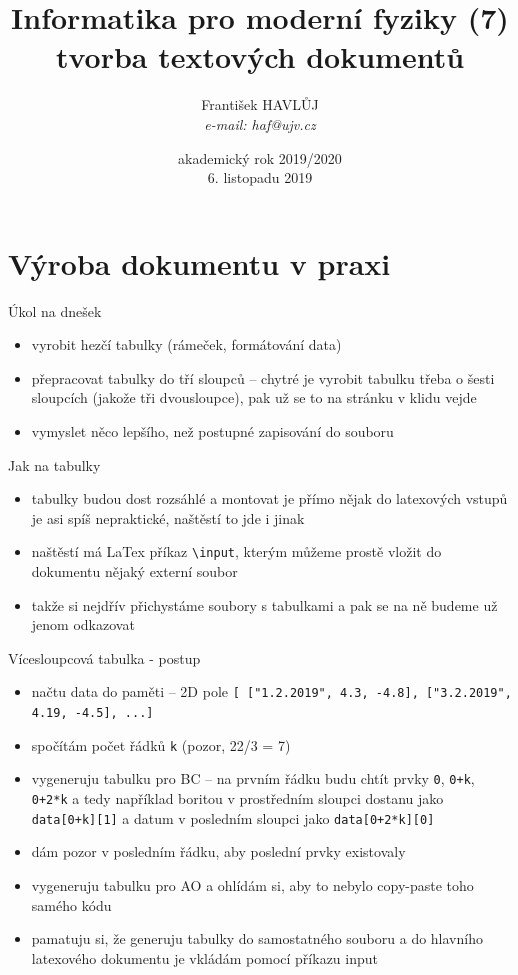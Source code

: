 \documentclass{beamer}
\title[IMF (7)]{Informatika pro moderní fyziky (7)\\tvorba textových dokumentů}
\author[Franti\v{s}ek HAVL\r{U}J, ORF ÚJV Řež]{Franti\v{s}ek HAVL\r{U}J\\{\scriptsize \emph{e-mail: haf@ujv.cz}}}
\date{akademický rok 2019/2020\\6. listopadu 2019}
\institute[ORF ÚJV Řež]
{ÚJV Řež\\oddělení Reaktorové fyziky a podpory palivového cyklu}
\begin{document}
\begin{frame}
  \titlepage
\end{frame}

\begin{frame}
  \tableofcontents
\end{frame}

\section{Výroba dokumentu v praxi}

\begin{frame}{Úkol na dnešek}
  \begin{itemize}
    \item vyrobit hezčí tabulky (rámeček, formátování data)
    \item přepracovat tabulky do tří sloupců --  chytré je vyrobit tabulku třeba o šesti sloupcích (jakože tři dvousloupce), pak už se to na stránku v klidu vejde

    \item vymyslet něco lepšího, než postupné zapisování do souboru
  \end{itemize}
\end{frame}

\begin{frame}[fragile]{Jak na tabulky}
  \begin{itemize}
    \item tabulky budou dost rozsáhlé a montovat je přímo nějak do latexových vstupů je asi spíš nepraktické, naštěstí to jde i jinak
    \item naštěstí má LaTex příkaz \texttt{\textbackslash{}input}, kterým můžeme prostě vložit do dokumentu nějaký externí soubor
    \item takže si nejdřív přichystáme soubory s tabulkami a pak se na ně budeme už jenom odkazovat
  \end{itemize}
\end{frame}


\begin{frame}[fragile]{Vícesloupcová tabulka - postup}
  \begin{itemize}
    \item načtu data do paměti -- 2D pole \texttt{[ ["1.2.2019", 4.3, -4.8], ["3.2.2019", 4.19, -4.5], ...]}
    \item spočítám počet řádků \texttt{k} (pozor, 22/3 = 7)
    \item vygeneruju tabulku pro BC -- na prvním řádku budu chtít prvky \texttt{0}, \texttt{0+k}, \texttt{0+2*k} a tedy například boritou v prostředním sloupci dostanu jako \texttt{data[0+k][1]} a datum v posledním sloupci jako \texttt{data[0+2*k][0]}
    \item dám pozor v posledním řádku, aby poslední prvky existovaly
    \item vygeneruju tabulku pro AO a ohlídám si, aby to nebylo copy-paste toho samého kódu
    \item pamatuju si, že generuju tabulky do samostatného souboru a do hlavního latexového dokumentu je vkládám pomocí příkazu input
  \end{itemize}
\end{frame}
\end{document}
